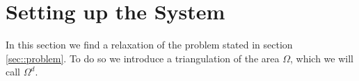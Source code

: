 
\section{\label{sec::setupSystem}Setting up the System}
In this section we find a relaxation of the problem stated in section \ref{sec::problem}. To do so we introduce a triangulation of the area $\Omega$, which we will call $\Omega^d$.